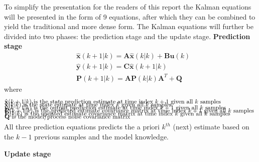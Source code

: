 To simplify the presentation for the readers of this report the Kalman equations will be presented in the form of 9 equations, after which they can be combined to yield the traditional and more dense form.
The Kalman equations will further be divided into two phases: the prediction stage and the update stage. %
\textbf{Prediction stage}
\begin{align}
	&\hat{\textbf{x}}(k+1|k) = \textbf{A} \hat{\textbf{x}}(k|k) + \textbf{B}\textbf{u}(k)  				\label{eq:Kalman_pred_state} 	\\
	&\hat{\textbf{y}}(k+1|k) = \textbf{C}\hat{\textbf{x}}(k+1|k)										\label{eq:Kalman_pred_output} 	\\
	&\textbf{P}(k+1|k) = \textbf{A}\textbf{P}(k|k)\textbf{A}^T+\textbf{Q} 								\label{eq:Kalman_pred_cov} 		
\end{align}
where 
\begin{align*}
	&\text{$\hat{\textbf{x}}(k+1|k)$ 	is the state prediction 			estimate at time index $k+1$ 		given all $ k $ samples		}	\\[-1em]
	&\text{$\hat{\textbf{x}}(k|k)$ 		is the state 						estimate at time index $k$ 	given all $ k $ samples				}	\\[-1em]
	&\text{$\hat{\textbf{y}}(k+1|k)$ 	is the output prediction 			estimate at time index $k+1$ 		given all $ k $ samples		}	\\[-1em]
	&\text{$\textbf{P}(k+1|k)$ 			is the predicted estimate  covariance matrix at time index $k+1$ 		given all $ k $ samples		}	\\[-1em]
	&\text{$\textbf{P}(k|k)$ 			is the updated estimate    covariance matrix at time index $k$ 	given all $ k $ samples				}	\\[-1em]
	&\text{$\textbf{Q}$					is the model/process noise covariance matrix														}	\\[-1em]
\end{align*}

All three prediction equations predicts the a priori $ k^{th}$ (next) estimate based on the $k-1$ previous samples and the model knowledge.

\textbf{Update stage}

